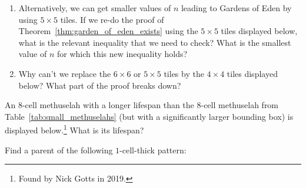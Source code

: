 \begin{multicols}{2}
\begin{problemstar}
\begin{enumerate}[label=\bf\color{ocre}(\alph*)]
	\begin{center}
		\\[1em]
	\end{center}
	
	\item Alternatively, we can get smaller values of $n$ leading to Gardens of Eden by using $5 \times 5$ tiles. If we re-do the proof of Theorem~\ref{thm:garden_of_eden_exists} using the $5 \times 5$ tiles displayed below, what is the relevant inequality that we need to check? What is the smallest value of $n$ for which this new inequality holds?
	
	\begin{center}
	\end{center}
	
	\item Why can't we replace the $6 \times 6$ or $5 \times 5$ tiles by the $4 \times 4$ tiles displayed below? What part of the proof breaks down?
	
	\begin{center}
	\end{center}
\end{enumerate}
\end{problemstar}


\mfilbreak


\begin{problem}\label{exer:8cell_methuselah}
An $8$-cell methuselah with a longer lifespan than the $8$-cell methuselah from Table~\ref{tab:small_methuselahs} (but with a significantly larger bounding box) is displayed below.\footnote{Found by Nick Gotts in 2019.} What is its lifespan?

\begin{center}
\end{center}
\end{problem}


\mfilbreak


\begin{problem}\label{exer:goe_height_1_exercise}
	Find a parent of the following $1$-cell-thick pattern: \\[0.04em]
	
	\begin{center}
		\vspace*{-1em}
	\end{center}
\end{problem}



\end{multicols}
